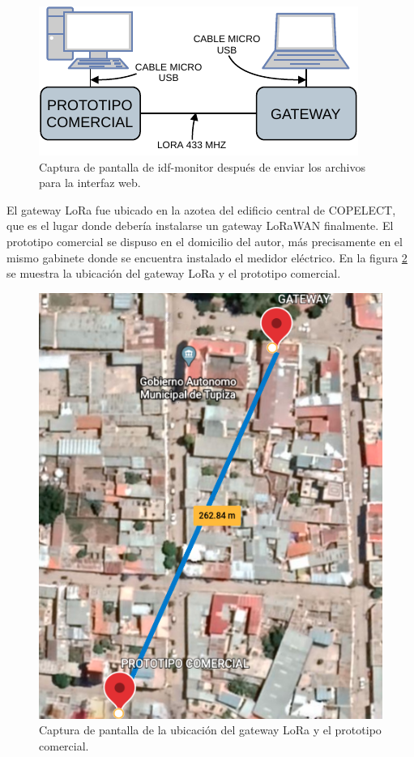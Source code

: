 \begin{figure}[ht]
	\centering
	\includegraphics[scale=1]{./Figures/test_lora_bank.pdf}
	\caption{Captura de pantalla de idf-monitor después de enviar los archivos para la interfaz web.}
	\label{fig:testLoraBank}
\end{figure}

El gateway LoRa fue ubicado en la azotea del edificio central de COPELECT, que es el lugar donde debería instalarse un gateway LoRaWAN finalmente. El prototipo comercial se dispuso en el domicilio del autor, más precisamente en el mismo gabinete donde se encuentra instalado el medidor eléctrico. En la figura \ref{fig:testLoraUbi} se muestra la ubicación del gateway LoRa y el prototipo comercial.

\begin{figure}[ht]
	\centering
	\includegraphics[scale=0.41]{./Figures/test_lora_location.png}
	\caption{Captura de pantalla de la ubicación del gateway LoRa y el prototipo comercial.}
	\label{fig:testLoraUbi}
\end{figure}

